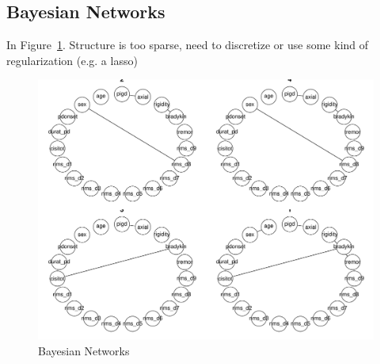 \documentclass[letterpaper,12pt]{article}
\begin{document}
\subsection{Bayesian Networks}

In Figure~\ref{fig:bnets}. Structure is too sparse, need to discretize or use
some kind of regularization (e.g. a lasso)

\begin{figure}[h]
  \centering
  \includegraphics[width=0.8\linewidth]{bnets.pdf}
  \caption{Bayesian Networks}
  \label{fig:bnets}
\end{figure}
\end{document}

